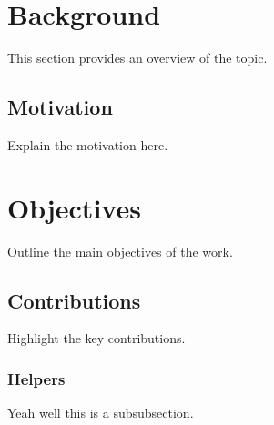 \section{Background}

This section provides an overview of the topic.

\subsection{Motivation}

Explain the motivation here.

\section{Objectives}

Outline the main objectives of the work. \cite{example_article}

\subsection{Contributions}

Highlight the key contributions.

\subsubsection{Helpers}

Yeah well this is a subsubsection.